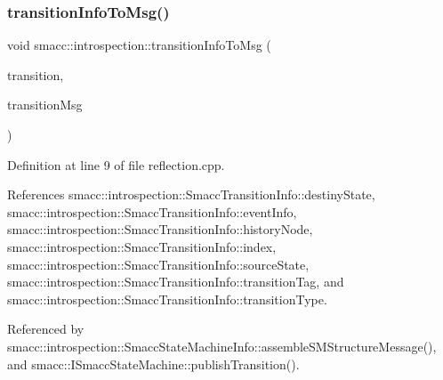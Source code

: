 \mbox{\label{namespacesmacc_1_1introspection_a6c1b51c4d44fd5e41fe218f1ee150681}} 
\subsubsection{\texorpdfstring{transition\+Info\+To\+Msg()}{transitionInfoToMsg()}}
{\footnotesize\ttfamily void smacc\+::introspection\+::transition\+Info\+To\+Msg (\begin{DoxyParamCaption}\item[{const \hyperlink{structsmacc_1_1introspection_1_1SmaccTransitionInfo}{Smacc\+Transition\+Info} \&}]{transition,  }\item[{smacc\+\_\+msgs\+::\+Smacc\+Transition \&}]{transition\+Msg }\end{DoxyParamCaption})}



Definition at line 9 of file reflection.\+cpp.



References smacc\+::introspection\+::\+Smacc\+Transition\+Info\+::destiny\+State, smacc\+::introspection\+::\+Smacc\+Transition\+Info\+::event\+Info, smacc\+::introspection\+::\+Smacc\+Transition\+Info\+::history\+Node, smacc\+::introspection\+::\+Smacc\+Transition\+Info\+::index, smacc\+::introspection\+::\+Smacc\+Transition\+Info\+::source\+State, smacc\+::introspection\+::\+Smacc\+Transition\+Info\+::transition\+Tag, and smacc\+::introspection\+::\+Smacc\+Transition\+Info\+::transition\+Type.



Referenced by smacc\+::introspection\+::\+Smacc\+State\+Machine\+Info\+::assemble\+S\+M\+Structure\+Message(), and smacc\+::\+I\+Smacc\+State\+Machine\+::publish\+Transition().



